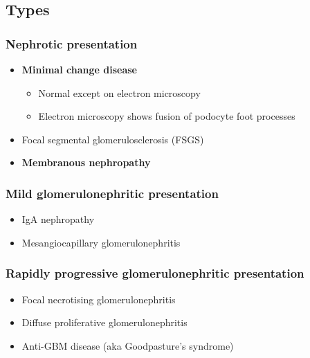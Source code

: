 \documentclass[
  12pt,
]{memoir}
\providecommand{\tightlist}{%
  \setlength{\itemsep}{0pt}\setlength{\parskip}{0pt}}
\begin{document}
\hypertarget{types-1}{%
\subsection{Types}\label{types-1}}

\hypertarget{nephrotic-presentation}{%
\subsubsection{Nephrotic presentation}\label{nephrotic-presentation}}

\begin{itemize}
\tightlist
\item
  \textbf{Minimal change disease}

  \begin{itemize}
  \tightlist
  \item
    Normal except on electron microscopy
  \item
    Electron microscopy shows fusion of podocyte foot processes
  \end{itemize}
\item
  Focal segmental glomerulosclerosis (FSGS)
\item
  \textbf{Membranous nephropathy}
\end{itemize}

\hypertarget{mild-glomerulonephritic-presentation}{%
\subsubsection{Mild glomerulonephritic
presentation}\label{mild-glomerulonephritic-presentation}}

\begin{itemize}
\tightlist
\item
  IgA nephropathy
\item
  Mesangiocapillary glomerulonephritis
\end{itemize}

\hypertarget{rapidly-progressive-glomerulonephritic-presentation}{%
\subsubsection{Rapidly progressive glomerulonephritic
presentation}\label{rapidly-progressive-glomerulonephritic-presentation}}

\begin{itemize}
\tightlist
\item
  Focal necrotising glomerulonephritis
\item
  Diffuse proliferative glomerulonephritis
\item
  Anti-GBM disease (aka Goodpasture's syndrome)
\end{itemize}
\end{document}
